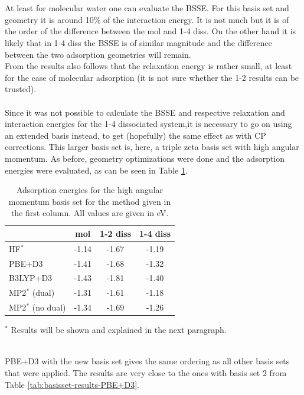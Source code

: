 \documentclass[11pt,DIV=13,BCOR=5mm,a4paper,headinclude]{scrbook}
\begin{document}
\\
\\
At least for molecular water one can evaluate the BSSE.
For this basis set and geometry it is around 10$\%$ of the interaction
energy.
It is not much but it is of the order of the difference between the mol and 1-4 diss.
On the other hand it is likely that in 1-4 diss the BSSE is of similar magnitude and the difference between the two adsorption geometries will remain.
\\
From the results also follows that the relaxation energy is rather small, at least for the case of molecular adsorption (it is not sure whether the 1-2 results can be trusted).
\\\\
Since it was not possible to calculate the BSSE and respective relaxation and interaction energies for the 1-4 dissociated system,it is necessary to go on using an extended basis instead, to get (hopefully) the same effect as with CP corrections.
This larger basis set is, here, a triple zeta basis set with high angular momentum.
As before, geometry optimizations were done and the adsorption energies were evaluated, as can be seen in Table \ref{tab:combined_results}.
\begin{table}[!h]
  \centering
   \caption{Adsorption energies for the high angular momentum basis set for the method given in the first column.
All values are given in eV.}
  \begin{tabular}{l|ccc}
  \toprule
   &mol & 1-2 diss & 1-4 diss \\\midrule
HF$^\ast$ &-1.14 & -1.67 & -1.19\\
PBE+D3 & -1.41 & -1.68 & -1.32 \\
B3LYP+D3 & -1.43 & -1.81 & -1.40 \\
MP2$^\ast$ (dual) & -1.31 & -1.61 & -1.18 \\ %
MP2$^\ast$ (no dual) & -1.34 & -1.69 & -1.26\\\bottomrule
  \end{tabular}
  \begin{tablenotes}
 \footnotesize
\item[] $^\ast$ Results will be shown and explained in the next paragraph.
  \end{tablenotes}
  \label{tab:combined_results}
\end{table}
\\
PBE+D3 with the new basis set gives the same ordering as all other basis sets that were applied.
The results are very close to the ones with basis set 2 from Table \ref{tab:basisset-results-PBE+D3}.
\end{document}
